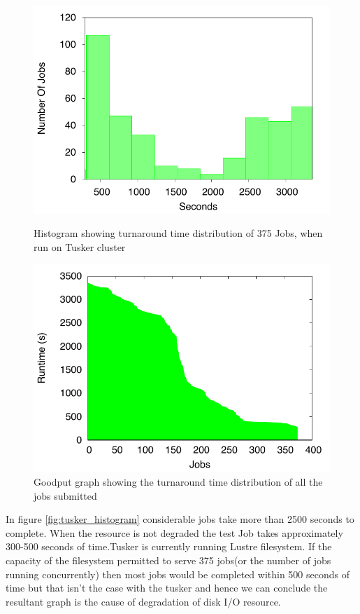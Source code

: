 \documentclass[ms,electronic,double]{nuthesis}
\begin{document}
\begin{figure}[h!]
\begin{center}
\includegraphics{images/tusker_histogram}
\caption{Histogram showing turnaround time distribution of 375 Jobs, when run on Tusker cluster}
\label{fig:tusker_histogram}
\end{center}

\begin{center}
\includegraphics{images/tusker_jobgoodput}
\caption{Goodput graph showing the turnaround time distribution of all the jobs submitted}
\label{fig:tusker_jobgoodput}
\end{center}

\end{figure}
\FloatBarrier

In figure \ref{fig:tusker_histogram}  considerable jobs take more than 2500 seconds to complete. 
When the resource is not degraded the test Job takes approximately 300-500 seconds of time.Tusker is 
currently running Lustre filesystem. If the capacity of the filesystem permitted 
to serve 375 jobs(or the number of jobs running concurrently) then most jobs 
would be completed within 500 seconds of time but that isn't the case with the 
tusker and hence we can conclude the resultant graph is the cause of degradation 
of disk I/O resource.
\end{document}
